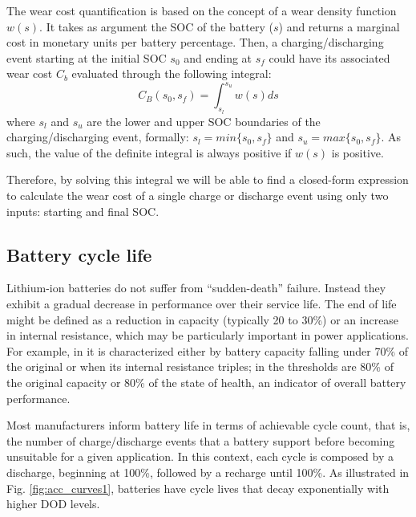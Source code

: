 \documentclass{ieeeaccess}
\begin{document}
%




    The wear cost quantification is based on the concept of a wear density function $w(s)$. It takes as argument the SOC of the battery ($s$) and returns a marginal cost in monetary units per battery percentage. Then, a charging/discharging event starting at the initial SOC $s_{0}$ and ending at $s_{f}$ could have its associated wear cost $C_{b}$ evaluated through the following integral:
    \begin{equation}
        C_{B}(s_{0}, s_{f}) = \int_{s_{l}}^{s_{u}}w(s)ds
        \label{eq:Cb(s0,sf)}
    \end{equation}
    where $s_{l}$ and $s_{u}$ are the lower and upper SOC boundaries of the charging/discharging event, formally: $s_{l} = min\{s_{0}, s_{f}\}$ and $s_{u} = max\{s_{0}, s_{f}\}$. As such, the value of the definite integral is always positive if $w(s)$ is positive.

    Therefore, by solving this integral we will be able to find a closed-form expression to calculate the wear cost of a single charge or discharge event using only two inputs: starting and final SOC.

    \subsection{Battery cycle life}
    Lithium-ion batteries do not suffer from ``sudden-death'' failure. Instead they exhibit a gradual decrease in performance over their service life. The end of life might be defined as a reduction in capacity (typically 20 to 30\%) or an increase in internal resistance, which may be particularly important in power applications. For example, in \cite{ECKER2014} it is characterized either by battery capacity falling under 70\% of the original or when its internal resistance triples; in \cite{NARAYAN2018} the thresholds are 80\% of the original capacity or 80\% of the state of health, an indicator of overall battery performance.

    Most manufacturers inform battery life in terms of achievable cycle count, that is, the number of charge/discharge events that a battery support before becoming unsuitable for a given application. In this context, each cycle is composed by a discharge, beginning at 100\%, followed by a recharge until 100\%. As illustrated in Fig. \ref{fig:acc_curves1}, batteries have cycle lives that decay exponentially with higher DOD levels.
\end{document}
